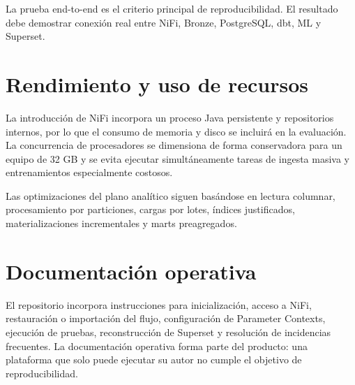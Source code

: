 La prueba end-to-end es el criterio principal de reproducibilidad. El resultado debe demostrar conexión real entre NiFi, Bronze, PostgreSQL, dbt, ML y Superset.

\section{Rendimiento y uso de recursos}

La introducción de NiFi incorpora un proceso Java persistente y repositorios internos, por lo que el consumo de memoria y disco se incluirá en la evaluación. La concurrencia de procesadores se dimensiona de forma conservadora para un equipo de 32 GB y se evita ejecutar simultáneamente tareas de ingesta masiva y entrenamientos especialmente costosos.

Las optimizaciones del plano analítico siguen basándose en lectura columnar, procesamiento por particiones, cargas por lotes, índices justificados, materializaciones incrementales y marts preagregados.

\section{Documentación operativa}

El repositorio incorpora instrucciones para inicialización, acceso a NiFi, restauración o importación del flujo, configuración de Parameter Contexts, ejecución de pruebas, reconstrucción de Superset y resolución de incidencias frecuentes. La documentación operativa forma parte del producto: una plataforma que solo puede ejecutar su autor no cumple el objetivo de reproducibilidad.
